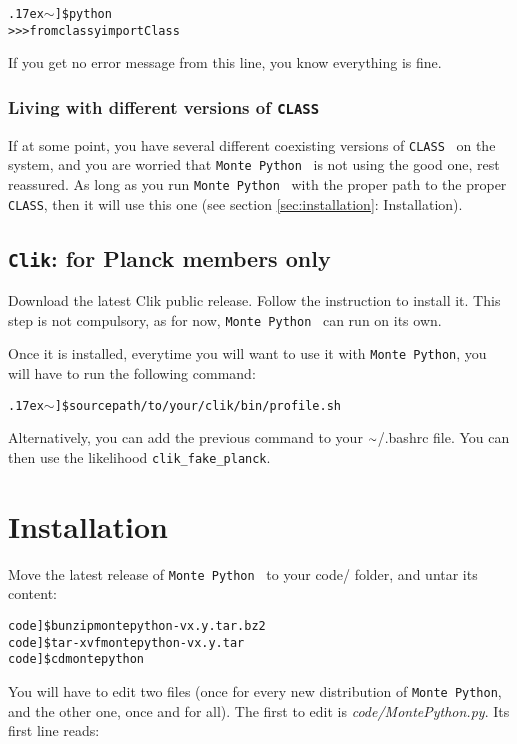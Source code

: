 \documentclass[10pt]{article}
\newcommand{\CLASS}{\texttt{CLASS}}
\newcommand{\MP}{\texttt{Monte Python}}
\newcommand{\Clik}{\texttt{Clik}}
\newcommand{\tild}{\raise.17ex\hbox{$\scriptstyle\mathtt{\sim}$}}
\begin{document}
  \begin{alltt}
    \tild]\$ python
    >>> from classy import Class
  \end{alltt}

  If you get no error message from this line, you know everything is fine.

  \subsubsection*{Living with different versions of \CLASS}

  If at some point, you have several different coexisting versions of \CLASS~
  on the system, and you are worried that \MP~ is not using the good one, rest
  reassured. As long as you run \MP~ with the proper path to the proper \CLASS,
  then it will use this one (see section \ref{sec:installation}: Installation).

  \subsection{\Clik: for Planck members only}

  Download the latest Clik public release. Follow the instruction to install
  it. This step is not compulsory, as for now, \MP~ can run on its own.

  Once it is installed, everytime you will want to use it with \MP,
  you will have to run the following command:

  \begin{alltt}
    \tild]\$ source path/to/your/clik/bin/profile.sh
  \end{alltt}
  
  Alternatively, you can add the previous command to your $\tild$/.bashrc file.
  You can then use the likelihood \verb?clik_fake_planck?.

\newpage
\section{Installation\label{sec:installation}}

  Move the latest release of \MP~ to your code/ folder, and untar its
  content:

  \begin{alltt} 
    code]\$ bunzip montepython-vx.y.tar.bz2 
    code]\$ tar -xvf montepython-vx.y.tar
    code]\$ cd montepython
  \end{alltt}

 You will have to edit two files (once for every new distribution of \MP, and
 the other one, once and for all). The first to edit is
 \emph{code/MontePython.py}. Its first line reads:
\end{document}
